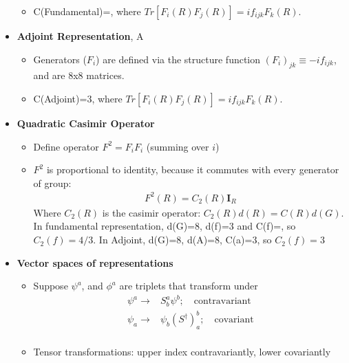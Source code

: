 \begin{itemize}
\begin{itemize}
        \item C(Fundamental)=\half, where $Tr[F_i(R)F_j(R)]=if_{ijk}F_k(R)$. \cite{hokim}
    \end{itemize}
    \item \textbf{Adjoint Representation}, A \cite{hokim}
    \begin{itemize}
        \item Generators ($F_i$) are defined via the structure function $(F_i)_{jk}\equiv-if_{ijk}$, and are 8x8 matrices. \cite{hokim}
        \item C(Adjoint)=3, where $Tr[F_i(R)F_j(R)]=if_{ijk}F_k(R)$. \cite{hokim}
    \end{itemize}
    \item \textbf{Quadratic Casimir Operator} \cite{hokim}
    \begin{itemize}
        \item Define operator $F^2=F_iF_i$ (summing over $i$) \cite{hokim}
        \item $F^2$ is proportional to identity, because it commutes with every generator of group: \cite{hokim}
        \begin{equation}\begin{split}
        F^2(R)=C_2(R)\pmb I_R
        \end{split}\end{equation}
        Where $C_2(R)$ is the casimir operator: $C_2(R)d(R)=C(R)d(G)$. In fundamental representation, d(G)=8, d(f)=3 and C(f)=\half, so $C_2(f)=4/3$. In Adjoint, d(G)=8, d(A)=8, C(a)=3, so $C_2(f)=3$
    \end{itemize}
    \item \textbf{Vector spaces of representations} \cite{hokim}
    \begin{itemize}
        \item Suppose $\psi^a$, and $\phi^a$ are triplets that transform under \cite{hokim}
        \begin{equation}\begin{split}
        \psi^a\to& S^a_b\psi^b ; \quad\text{contravariant}\\
        \psi_a\to& \psi_b(S^\dagger)^b_a ; \quad\text{covariant}\\
        \end{split}\end{equation}
        \item Tensor transformations: upper index contravariantly, lower covariantly \cite{hokim}
        \begin{equation}\begin{split}

\end{split}
\end{equation}
\end{itemize}
\end{itemize}
